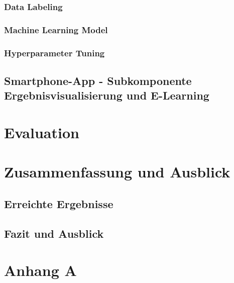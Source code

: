 \documentclass[oneside]{ausarbeitung}
\begin{document}
\subsection*{Data Labeling}

\subsection*{Machine Learning Model}

\subsection*{Hyperparameter Tuning}

\section{Smartphone-App - Subkomponente Ergebnisvisualisierung und E-Learning}
\label{sec:implement_elearning}

\chapter{Evaluation}
\label{cha:evaluation}

\chapter{Zusammenfassung und Ausblick}
\label{cha:zusammenfassung}

\section{Erreichte Ergebnisse}
\label{sec:ergebnisse}

\section{Fazit und Ausblick}
\label{sec:ausblick}

\appendix

\printbibliography[heading=bibintoc]

\chapter{Anhang A}
\end{document}
